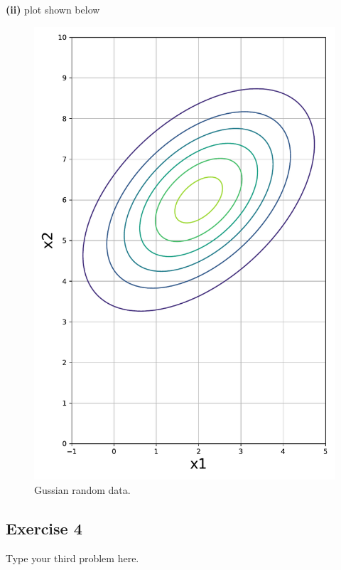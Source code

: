 \documentclass[11pt]{article}
\begin{document}
\noindent\textbf{(ii)}
plot shown below
\begin{figure}[h]
\centering
\includegraphics[width=0.5\linewidth]{exercise3_a}
\caption{Gussian random data.}
\label{fig: figure 1}
\end{figure}
\pagebreak
\subsection*{Exercise 4}
Type your third problem here.
\end{document}
